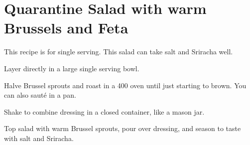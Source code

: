 \section{Quarantine Salad with warm Brussels and Feta}
\begin{recipe}


This recipe is for single serving. This salad can take salt and Sriracha well.


Layer directly in a large single serving bowl.


Halve Brussel sprouts and roast in a 400\degree{} oven until just starting to
brown. You can also sauté in a pan.


Shake to combine dressing in a closed container, like a mason jar.

Top salad with warm Brussel sprouts, pour over dressing, and season to taste
with salt and Sriracha.

\end{recipe}

